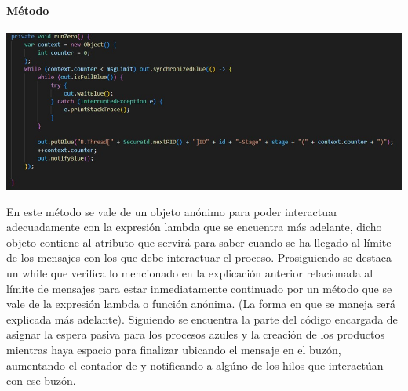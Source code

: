 \documentclass[a4paper]{article}
\begin{document}
    \paragraph{M\'etodo }
    \begin{center}
        \includegraphics[scale=0.5]{B2.jpeg}    
    \end{center}
    En este m\'etodo se vale de un objeto an\'onimo para poder interactuar adecuadamente con la expresi\'on lambda que se encuentra m\'as adelante, dicho objeto contiene al atributo  que servir\'a para saber cuando se ha llegado al l\'imite de los mensajes con los que debe interactuar el proceso.
    Prosiguiendo se destaca un while que verifica lo mencionado en la explicaci\'on anterior relacionada al l\'imite de mensajes para estar inmediatamente continuado por un m\'etodo que se vale de la expresi\'on lambda o funci\'on an\'onima.
    (La forma en que se maneja ser\'a explicada m\'as adelante).
    Siguiendo se encuentra la parte del c\'odigo encargada de asignar la espera pasiva para los procesos azules y la creaci\'on de los productos mientras haya espacio para finalizar ubicando el mensaje en el buz\'on, aumentando el contador de  y notificando a alg\'uno de los hilos que interact\'uan con ese buz\'on.
    \pagebreak
\end{document}
